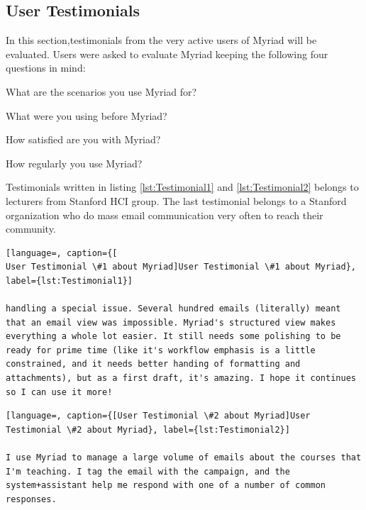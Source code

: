 \clearpage

\subsection{User Testimonials}
\label{subsec:5.4.2:UserTest}

In this section,testimonials from the very active users of Myriad will be evaluated. Users were asked to evaluate Myriad keeping the following four questions in mind:

\begin{compactenum}
	\item What are the scenarios you use Myriad for?
	\item What were you using before Myriad?
	\item How satisfied are you with Myriad?
	\item How regularly you use Myriad?
\end{compactenum}

Testimonials written in listing \ref{lst:Testimonial1} and \ref{lst:Testimonial2} belongs to lecturers from Stanford \ac{HCI} group. The last testimonial belongs to a Stanford organization who do mass email communication very often to reach their community.

\vspace{1cm}


\begin{lstlisting}[language=, caption={[
User Testimonial \#1 about Myriad]User Testimonial \#1 about Myriad}, label={lst:Testimonial1}]

handling a special issue. Several hundred emails (literally) meant that an email view was impossible. Myriad's structured view makes everything a whole lot easier. It still needs some polishing to be ready for prime time (like it's workflow emphasis is a little constrained, and it needs better handing of formatting and attachments), but as a first draft, it's amazing. I hope it continues so I can use it more!
\end{lstlisting}

\vspace{1cm}

\begin{lstlisting}[language=, caption={[User Testimonial \#2 about Myriad]User Testimonial \#2 about Myriad}, label={lst:Testimonial2}]

I use Myriad to manage a large volume of emails about the courses that I'm teaching. I tag the email with the campaign, and the system+assistant help me respond with one of a number of common responses.
\end{lstlisting}


